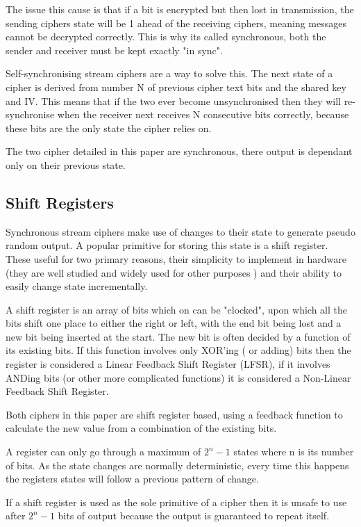 \documentclass{report}
\let\Oldsubsection\subsection
\renewcommand{\subsection}{\FloatBarrier\Oldsubsection}
\begin{document}
The issue this cause is that if a bit is encrypted but then lost in transmission, the sending ciphers state will be 1 ahead of the receiving ciphers, meaning messages cannot be decrypted correctly. This is why its called synchronous, both the sender and receiver must be kept exactly "in sync".

Self-synchronising stream ciphers are a way to solve this. The next state of a cipher is derived from number N of previous cipher text bits and the shared key and IV. This means that if the two ever become unsynchronised then they will re-synchronise when the receiver next receives N consecutive bits correctly, because these bits are the only state the cipher relies on.

The two cipher detailed in this paper are synchronous, there output is dependant only on their previous state.

\subsection*{Shift Registers}
Synchronous stream ciphers make use of changes to their state to generate pseudo random output. A popular primitive for storing this state is a shift register. These useful for two primary reasons, their simplicity to implement in hardware (they are well studied and widely used for other purposes%
) and their ability to easily change state incrementally.

A shift register is an array of bits which on can be "clocked", upon which all the bits shift one place to either the right or left, with the end bit being lost and a new bit being inserted at the start. The new bit is often decided by a function of its existing bits. If this function involves only XOR'ing ( or adding) bits then the register is considered a Linear Feedback Shift Register (LFSR), if it involves ANDing bits (or other more complicated functions) it is considered a Non-Linear Feedback Shift Register. 

Both ciphers in this paper are shift register based, using a feedback function to calculate the new value from a combination of the existing bits.

A register can only go through a maximum of $2^n-1$ states where n is its number of bits. As the state changes are normally deterministic, every time this happens the registers states will follow a previous pattern of change.

If a shift register is used as the sole primitive of a cipher then it is unsafe to use after $2^n-1$ bits of output because the output is guaranteed to repeat itself.
\end{document}
